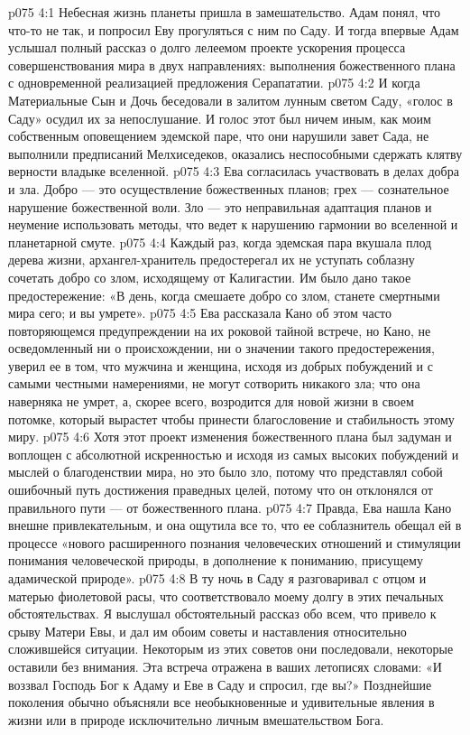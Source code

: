 \vs p075 4:1 Небесная жизнь планеты пришла в замешательство. Адам понял, что что\hyp{}то не так, и попросил Еву прогуляться с ним по Саду. И тогда впервые Адам услышал полный рассказ о долго лелеемом проекте ускорения процесса совершенствования мира в двух направлениях: выполнения божественного плана с одновременной реализацией предложения Серапататии.
\vs p075 4:2 И когда Материальные Сын и Дочь беседовали в залитом лунным светом Саду, «голос в Саду» осудил их за непослушание. И голос этот был ничем иным, как моим собственным оповещением эдемской паре, что они нарушили завет Сада, не выполнили предписаний Мелхиседеков, оказались неспособными сдержать клятву верности владыке вселенной.
\vs p075 4:3 Ева согласилась участвовать в делах добра и зла. Добро --- это осуществление божественных планов; грех --- сознательное нарушение божественной воли. Зло --- это неправильная адаптация планов и неумение использовать методы, что ведет к нарушению гармонии во вселенной и планетарной смуте.
\vs p075 4:4 Каждый раз, когда эдемская пара вкушала плод дерева жизни, архангел\hyp{}хранитель предостерегал их не уступать соблазну сочетать добро со злом, исходящему от Калигастии. Им было дано такое предостережение: «В день, когда смешаете добро со злом, станете смертными мира сего; и вы умрете».
\vs p075 4:5 Ева рассказала Кано об этом часто повторяющемся предупреждении на их роковой тайной встрече, но Кано, не осведомленный ни о происхождении, ни о значении такого предостережения, уверил ее в том, что мужчина и женщина, исходя из добрых побуждений и с самыми честными намерениями, не могут сотворить никакого зла; что она наверняка не умрет, а, скорее всего, возродится для новой жизни в своем потомке, который вырастет чтобы принести благословение и стабильность этому миру.
\vs p075 4:6 Хотя этот проект изменения божественного плана был задуман и воплощен с абсолютной искренностью и исходя из самых высоких побуждений и мыслей о благоденствии мира, но это было зло, потому что представлял собой ошибочный путь достижения праведных целей, потому что он отклонялся от правильного пути --- от божественного плана.
\vs p075 4:7 Правда, Ева нашла Кано внешне привлекательным, и она ощутила все то, что ее соблазнитель обещал ей в процессе «нового расширенного познания человеческих отношений и стимуляции понимания человеческой природы, в дополнение к пониманию, присущему адамической природе».
\vs p075 4:8 В ту ночь в Саду я разговаривал с отцом и матерью фиолетовой расы, что соответствовало моему долгу в этих печальных обстоятельствах. Я выслушал обстоятельный рассказ обо всем, что привело к срыву Матери Евы, и дал им обоим советы и наставления относительно сложившейся ситуации. Некоторым из этих советов они последовали, некоторые оставили без внимания. Эта встреча отражена в ваших летописях словами: «И воззвал Господь Бог к Адаму и Еве в Саду и спросил, где вы?» Позднейшие поколения обычно объясняли все необыкновенные и удивительные явления в жизни или в природе исключительно личным вмешательством Бога.
